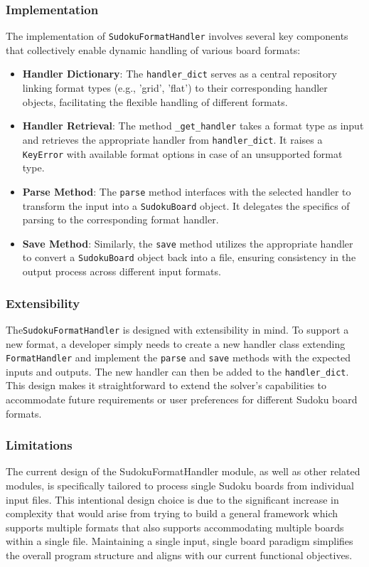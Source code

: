 \documentclass[11pt]{article}
\begin{document}
\subsubsection{Implementation}
The implementation of \texttt{SudokuFormatHandler} involves several key components that collectively enable dynamic handling of various board formats:

\begin{itemize}
    \item \textbf{Handler Dictionary}: The \texttt{handler\_dict} serves as a central repository linking format types (e.g., 'grid', 'flat') to their corresponding handler objects, facilitating the flexible handling of different formats.
    \item \textbf{Handler Retrieval}: The method \texttt{\_get\_handler} takes a format type as input and retrieves the appropriate handler from \texttt{handler\_dict}. It raises a \texttt{KeyError} with available format options in case of an unsupported format type.
    \item \textbf{Parse Method}: The \texttt{parse} method interfaces with the selected handler to transform the input into a \texttt{SudokuBoard} object. It delegates the specifics of parsing to the corresponding format handler.
    \item \textbf{Save Method}: Similarly, the \texttt{save} method utilizes the appropriate handler to convert a \texttt{SudokuBoard} object back into a file, ensuring consistency in the output process across different input formats.
\end{itemize}


\subsubsection{Extensibility}
The\texttt{SudokuFormatHandler} is designed with extensibility in mind. To support a new format, a developer simply needs to create a new handler class extending \texttt{FormatHandler} and implement the \texttt{parse} and \texttt{save} methods with the expected inputs and outputs. The new handler can then be added to the \texttt{handler\_dict}. This design makes it straightforward to extend the solver's capabilities to accommodate future requirements or user preferences for different Sudoku board formats.


\subsubsection{Limitations}
The current design of the SudokuFormatHandler module, as well as other related modules, is specifically tailored to process single Sudoku boards from individual input files. This intentional design choice is due to the significant increase in complexity that would arise from trying to build a general framework which supports multiple formats that also supports accommodating multiple boards within a single file. Maintaining a single input, single board paradigm simplifies the overall program structure and aligns with our current functional objectives. 
\end{document}
